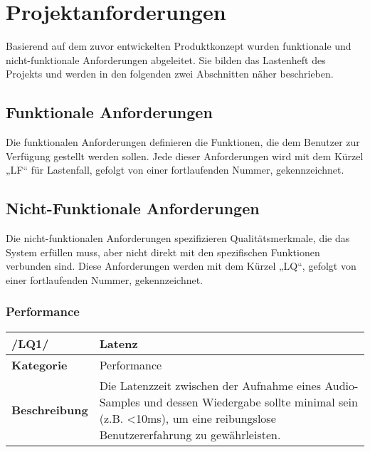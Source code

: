 \newpage
\section{Projektanforderungen}

Basierend auf dem zuvor entwickelten Produktkonzept wurden funktionale und nicht-funktionale Anforderungen abgeleitet. Sie bilden das Lastenheft des Projekts und werden in den folgenden zwei Abschnitten näher beschrieben.

\subsection{Funktionale Anforderungen}
Die funktionalen Anforderungen definieren die Funktionen, die dem Benutzer zur Verfügung gestellt werden sollen. Jede dieser Anforderungen wird mit dem Kürzel „LF“ für Lastenfall, gefolgt von einer fortlaufenden Nummer, gekennzeichnet.





\newpage

\subsection{Nicht-Funktionale Anforderungen}
Die nicht-funktionalen Anforderungen spezifizieren Qualitätsmerkmale, die das System erfüllen muss, aber nicht direkt mit den spezifischen Funktionen verbunden sind. Diese Anforderungen werden mit dem Kürzel „LQ“, gefolgt von einer fortlaufenden Nummer, gekennzeichnet.


\subsubsection{Performance}

\begin{table}[h!]
	\begin{tabularx}{\textwidth}{|l|X|}
		\hline
		\textbf{/LQ1/} & \textbf{Latenz} \\ \hline
		\textbf{Kategorie} & Performance \\ \hline
		\textbf{Beschreibung} & Die Latenzzeit zwischen der Aufnahme eines Audio-Samples und dessen Wiedergabe sollte minimal sein (z.B. <10ms), um eine reibungslose Benutzererfahrung zu gewährleisten. \\ \hline
	\end{tabularx}
\end{table}

